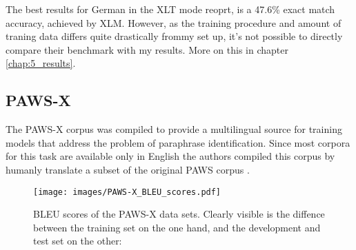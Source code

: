 The best results for German in the XLT mode \citeauthor{lewis2019mlqa} reoprt, is a 47.6\% exact
match accuracy, achieved by XLM. However, as the training procedure and amount of traning data
differs quite drastically frommy set up, it's not possible to directly compare their benchmark
with my results. More on this in chapter \ref{chap:5_results}.




\subsection{PAWS-X}

The PAWS-X corpus \cite{yang2019paws} was compiled to provide a multilingual source for training
models that address the problem of paraphrase identification.
Since most corpora for this task are available only in English the authors compiled this corpus by
humanly translate a subset of the original PAWS corpus \cite{zhang2019paws}.

\begin{wrapfigure}{r}{0.45\linewidth}
  \begin{center}
    \texttt{[image: images/PAWS-X\_BLEU\_scores.pdf]}
  \end{center}
  \caption[PAWS-X BLEU]{BLEU scores of the PAWS-X data sets. Clearly visible is the diffence between the training set on the one hand,
                      and the development and test set on the other:}
\end{wrapfigure}


